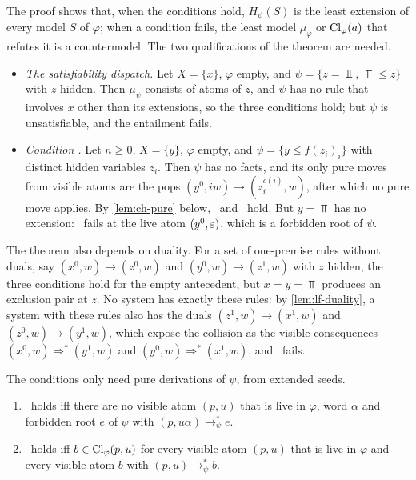 The proof shows that, when the conditions hold, $H_\psi(S)$ is the least
extension of every model $S$ of $\varphi$; when a condition fails, the least
model $\mu_\varphi$ or $\operatorname{Cl}_\varphi(a)$ that refutes it is a countermodel.
The two qualifications of the theorem are needed.
\begin{itemize}[leftmargin=*]
\item \emph{The satisfiability dispatch.} Let $X=\{x\}$, $\varphi$ empty, and
  $\psi=\{z=\Bot,\ \Top\le z\}$ with $z$ hidden. Then $\mu_\psi$ consists of
  atoms of $z$, and $\psi$ has no rule that involves $x$ other than its
  extensions, so the three conditions hold; but $\psi$ is unsatisfiable, and
  the entailment fails.
\item \emph{Condition \CondU.} Let $n\ge0$, $X=\{y\}$, $\varphi$ empty, and
  $\psi=\{y\le f(z_i)_i\}$ with distinct hidden variables $z_i$. Then $\psi$
  has no facts, and its only pure moves from visible atoms are the
  pops $(y^0,iw)\to(z_i^{c(i)},w)$, after which no pure move applies. By
  \cref{lem:ch-pure} below, \CondI\ and \CondII\ hold. But $y=\Top$ has no
  extension: \CondU\ fails at the live atom $(y^0,\varepsilon)$, which is a
  forbidden root of $\psi$.
\end{itemize}
The theorem also depends on duality. For a set of one-premise rules without
duals, say $(x^0,w)\to(z^0,w)$ and $(y^0,w)\to(z^1,w)$ with $z$ hidden, the
three conditions hold for the empty antecedent, but $x=y=\Top$ produces an
exclusion pair at $z$. No system has exactly these rules: by
\cref{lem:lf-duality}, a system with these rules also has the duals
$(z^1,w)\to(x^1,w)$ and $(z^0,w)\to(y^1,w)$, which expose the collision as the
visible consequences $(x^0,w)\Rightarrow^*(y^1,w)$ and
$(y^0,w)\Rightarrow^*(x^1,w)$, and \CondII\ fails.

The conditions only need pure derivations of $\psi$, from extended seeds.

\begin{lemma}\label{lem:ch-pure}
\leavevmode
\begin{enumerate}[leftmargin=*]
\item \CondU\ holds iff there are no visible atom $(p,u)$ that is live in
  $\varphi$, word $\alpha$ and forbidden root $e$ of $\psi$ with
  $(p,u\alpha)\to^*_\psi e$.
\item \CondII\ holds iff $b\in\operatorname{Cl}_\varphi(p,u)$ for every visible atom
  $(p,u)$ that is live in $\varphi$ and every visible atom $b$ with
  $(p,u)\to^*_\psi b$.
\end{enumerate}
\end{lemma}

